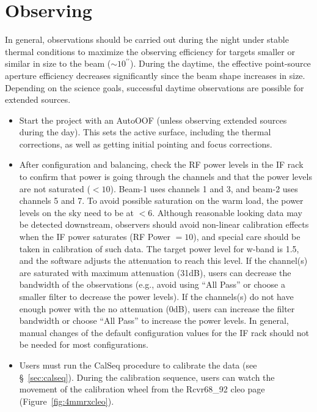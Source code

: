 \section{Observing}

In general, observations should be carried out during the night under
stable thermal conditions to maximize the observing efficiency for
targets smaller or similar in size to the beam ($\sim
10^{\prime\prime}$).  During the daytime, the effective point-source
aperture efficiency decreases significantly since the beam shape
increases in size.  Depending on the science goals, successful daytime
observations are possible for extended sources.

\begin{itemize}



\item Start the project with an AutoOOF (unless observing extended
  sources during the day).  This sets the active surface, including
  the thermal corrections, as well as getting initial pointing and
  focus corrections.  

\item After configuration and balancing, check the RF power levels in
  the IF rack to confirm that power is going through the channels and
  that the power levels are not saturated ($<10$).  Beam-1 uses
  channels 1 and 3, and beam-2 uses channels 5 and 7.  To avoid
  possible saturation on the warm load, the power levels on the sky
  need to be at $<6$.  Although reasonable looking data may be
  detected downstream, observers should avoid non-linear calibration effects
  when the IF power saturates (RF Power $=10$), and special care should
  be taken in calibration of such data.  The target power level for
  w-band is 1.5, and the software adjusts the attenuation to reach
  this level.  If the channel(s) are saturated with maximum
  attenuation (31dB), users can decrease the bandwidth of the
  observations (e.g., avoid using ``All Pass'' or choose a smaller
  filter to decrease the power levels).  If the channels(s) do not
  have enough power with the no attenuation (0dB), users can increase
  the filter bandwidth or choose ``All Pass'' to increase the power
  levels.  In general, manual changes of the default configuration
  values for the IF rack should not be needed for most configurations.

\item Users must run the CalSeq procedure to calibrate the data (see
  \S~\ref{sec:calseq}).  During the calibration sequence, users can
  watch the movement of the calibration wheel from the Rcvr68\_92 cleo
  page (Figure~\ref{fig:4mmrxcleo}).

\end{itemize}

